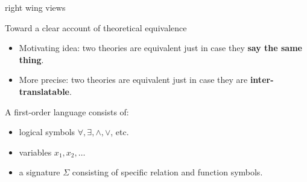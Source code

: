 \documentclass[17pt]{beamer}
\begin{document}
\begin{frame}{right wing views}


  \begin{center}
\end{center}



\end{frame}

\begin{frame}{\normalsize Toward a clear account of theoretical
    equivalence}


  \begin{itemize}
  \item Motivating idea: two theories are equivalent just in case they
    \textbf{say the same thing}.
  \item More precise: two theories are equivalent just in case they
    are \textbf{inter-translatable}.
   \end{itemize}


 \end{frame}

 \begin{frame}

   A first-order language consists of:
   \begin{itemize}
   \item logical symbols $\forall ,\exists ,\wedge ,\vee $, etc.\
   \item variables $x_1,x_2,\dots $
   \item a signature $\Sigma$ consisting of specific relation and
     function symbols.
   \end{itemize}

   \end{frame}
\end{document}
